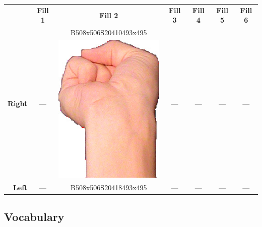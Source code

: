 \documentclass{article}
\begin{document}
\begin{center}
\begin{tabular}{r*{6}{c}}
&\textbf{Fill 1}&\textbf{Fill 2}&\textbf{Fill 3}&\textbf{Fill 4}&\textbf{Fill 5}&\textbf{Fill 6}\\
\multirow{2}{*}{\textbf{Right}}&
\multirow{2}{*}{---}&
B508x506S20410493x495&
\multirow{2}{*}{---}&
\multirow{2}{*}{---}&
\multirow{2}{*}{---}&
\multirow{2}{*}{---}\\
&
&
\includegraphics[scale=0.1]{images/10-07-2.jpg}\\
\textbf{Left}&
---&
B508x506S20418493x495&
---&
---&
---&
---\\
\end{tabular}
\end{center}

\subsection{Vocabulary}
\end{document}
